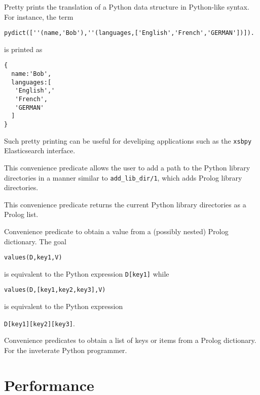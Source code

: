 \begin{description}

Pretty prints the translation of a Python data structure in
Python-like syntax.  For instance, the term

\begin{verbatim}
pydict([''(name,'Bob'),''(languages,['English','French','GERMAN'])]).
\end{verbatim}

\noindent
is printed as 
\begin{verbatim}
{
  name:'Bob',
  languages:[
   'English','
   'French',
   'GERMAN'
  ]
}
\end{verbatim}

Such pretty printing can be useful for develiping applications such as
the {\tt xsbpy} Elasticsearch interface.

%
This convenience predicate allows the user to add a path to the Python
library directories in a manner similar to {\tt add\_lib\_dir/1},
which adds Prolog library directories.

%
This convenience predicate returns the current Python library
directories as a Prolog list.

%
  Convenience predicate to obtain a value from a (possibly nested)
  Prolog dictionary.  The goal

  {\tt values(D,key1,V)}

\noindent
  is equivalent to the
  Python expression {\tt D[key1]} while

  {\tt values(D,[key1,key2,key3],V)}

\noindent
is equivalent to the Python expression

{\tt D[key1][key2][key3]}.

%
Convenience predicates to obtain a list of keys or items from a Prolog
dictionary.  For the inveterate Python programmer.

\end{description}

\section{Performance}

